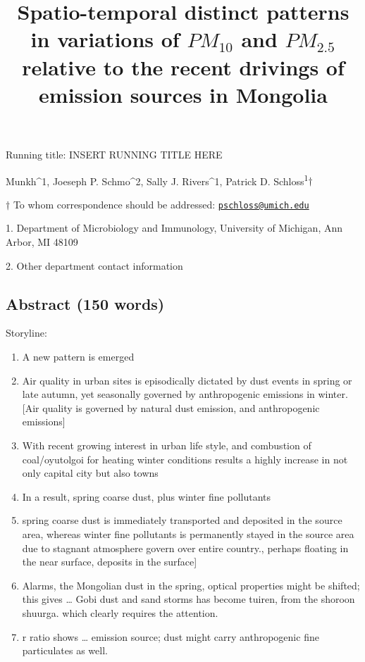 \documentclass[
  11pt,
]{article}
\title{\textbf{Spatio-temporal distinct patterns in variations of
\(PM_{10}\) and \(PM_{2.5}\) relative to the recent drivings of emission
sources in Mongolia}}
\author{}
\date{\vspace{-2.5em}}
\providecommand{\tightlist}{%
  \setlength{\itemsep}{0pt}\setlength{\parskip}{0pt}}
\begin{document}
\maketitle

\vspace{35mm}

Running title: INSERT RUNNING TITLE HERE

\vspace{35mm}

Munkh\^{}1, Joeseph P. Schmo\^{}2, Sally J. Rivers\^{}1, Patrick D.
Schloss\textsuperscript{1}\(\dagger\)

\vspace{40mm}

\(\dagger\) To whom correspondence should be addressed:
\href{mailto:pschloss@umich.edu}{\nolinkurl{pschloss@umich.edu}}

1. Department of Microbiology and Immunology, University of Michigan,
Ann Arbor, MI 48109

2. Other department contact information

\newpage
\linenumbers

\subsection{Abstract (150 words)}\label{abstract-150-words}

Storyline:

\begin{enumerate}
\def\labelenumi{\arabic{enumi}.}
\tightlist
\item
  A new pattern is emerged
\item
  Air quality in urban sites is episodically dictated by dust events in
  spring or late autumn, yet seasonally governed by anthropogenic
  emissions in winter. {[}Air quality is governed by natural dust
  emission, and anthropogenic emissions{]}
\item
  With recent growing interest in urban life style, and combustion of
  coal/oyutolgoi for heating winter conditions results a highly increase
  in not only capital city but also towns
\item
  In a result, spring coarse dust, plus winter fine pollutants
\item
  spring coarse dust is immediately transported and deposited in the
  source area, whereas winter fine pollutants is permanently stayed in
  the source area due to stagnant atmosphere govern over entire
  country., perhaps floating in the near surface, deposits in the
  surface{]}
\item
  Alarms, the Mongolian dust in the spring, optical properties might be
  shifted; this gives \ldots{} Gobi dust and sand storms has become
  tuiren, from the shoroon shuurga. which clearly requires the
  attention.
\item
  r ratio shows \ldots{} emission source; dust might carry anthropogenic
  fine particulates as well. \newpage
\end{enumerate}
\end{document}
